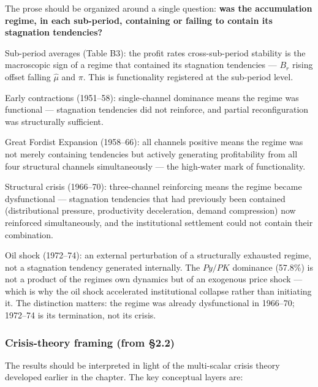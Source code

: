 The prose should be organized around a single question: \textbf{was the
accumulation regime, in each sub-period, containing or failing to
contain its stagnation tendencies?}

Sub-period averages (Table B3): the profit rate\textquotesingle s
cross-sub-period stability is the macroscopic sign of a regime that
contained its stagnation tendencies --- \(B_{r}\) rising offset falling
\(\hat{\mu}\) and \(\pi\). This is functionality registered at the
sub-period level.

Early contractions (1951--58): single-channel dominance means the regime
was functional --- stagnation tendencies did not reinforce, and partial
reconfiguration was structurally sufficient.

Great Fordist Expansion (1958--66): all channels positive means the
regime was not merely containing tendencies but actively generating
profitability from all four structural channels simultaneously --- the
high-water mark of functionality.

Structural crisis (1966--70): three-channel reinforcing means the regime
became dysfunctional --- stagnation tendencies that had previously been
contained (distributional pressure, productivity deceleration, demand
compression) now reinforced simultaneously, and the institutional
settlement could not contain their combination.

Oil shock (1972--74): an external perturbation of a structurally
exhausted regime, not a stagnation tendency generated internally. The
\(Py/PK\) dominance (57.8\%) is not a product of the
regime\textquotesingle s own dynamics but of an exogenous price shock
--- which is why the oil shock accelerated institutional collapse rather
than initiating it. The distinction matters: the regime was already
dysfunctional in 1966--70; 1972--74 is its termination, not its crisis.

\subsubsection{Crisis-theory framing (from
§2.2)}\label{crisis-theory-framing-from-22}

The results should be interpreted in light of the multi-scalar crisis
theory developed earlier in the chapter. The key conceptual layers are:

